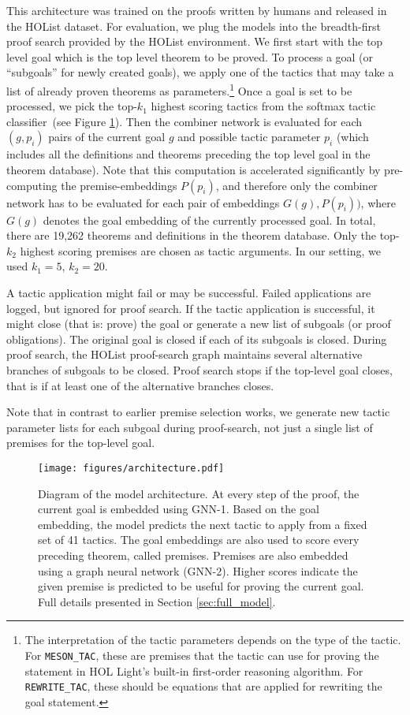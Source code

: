 \documentclass[letterpaper]{article} \usepackage{aaai20}  \usepackage{times}  \usepackage{helvet} \usepackage{courier}  \usepackage[hyphens]{url}  \usepackage{graphicx} \urlstyle{rm} \def\UrlFont{\rm}  \usepackage{graphicx}  \frenchspacing  \setlength{\pdfpagewidth}{8.5in}  \setlength{\pdfpageheight}{11in}
\begin{document}
This architecture was trained on the proofs written by humans and released in the HOList dataset.
For evaluation, we plug the models into the breadth-first proof search provided by the HOList environment. We first start with the top level goal which is the top level theorem to be proved. To process a goal (or ``subgoals'' for newly created goals), we apply one of the tactics that may take a list of already proven theorems as parameters.\footnote{The interpretation of the tactic parameters depends on the type of the tactic. For {\tt MESON\_TAC}, these are premises that the tactic can use for proving the statement in HOL Light's built-in first-order reasoning algorithm. For {\tt REWRITE\_TAC}, these should be equations that are applied for rewriting the goal statement.}
Once a goal is set to be processed, we pick the top-$k_1$ highest scoring tactics from the softmax tactic classifier~(see Figure \ref{fig:architecture}). Then the combiner network is evaluated for each $(g, p_i)$ pairs of the current goal $g$ and possible tactic parameter $p_i$ (which includes all the definitions and theorems preceding the top level goal in the theorem database). Note that this computation is accelerated significantly by pre-computing the premise-embeddings $P(p_i)$, and therefore only the combiner network has to be evaluated for each pair of embeddings $G(g), P(p_i))$, where $G(g)$ denotes the goal embedding of the currently processed goal. In total, there are 19,262 theorems and definitions in the theorem database.  Only the top-$k_2$ highest scoring premises are chosen as tactic arguments. In our setting, we used $k_1=5$, $k_2=20$.

A tactic application might fail or may be successful. Failed applications are logged, but ignored for proof search. If the tactic application is successful, it might close (that is: prove) the goal or generate a new list of subgoals (or proof obligations). The original goal is closed if each of its subgoals is closed. During proof search, the HOList proof-search graph maintains several alternative branches of subgoals to be closed. Proof search stops if the top-level goal closes, that is if at least one of the alternative branches closes.

Note that in contrast to earlier premise selection works, we generate new tactic parameter lists for each subgoal during proof-search, not just a single list of premises for the top-level goal.

\begin{figure}[t]
  \texttt{[image: figures/architecture.pdf]}
  \caption{
  Diagram of the model architecture.
  At every step of the proof, the current goal is embedded using GNN-1.
  Based on the goal embedding, the model predicts the next tactic to apply from a fixed set of 41 tactics.
  The goal embeddings are also used to score every preceding theorem, called premises.
  Premises are also embedded using a graph neural network (GNN-2).
  Higher scores indicate the given premise is predicted to be useful for proving the current goal.  Full details presented in Section \ref{sec:full_model}.
  }
  \label{fig:architecture}
\end{figure}
\end{document}

